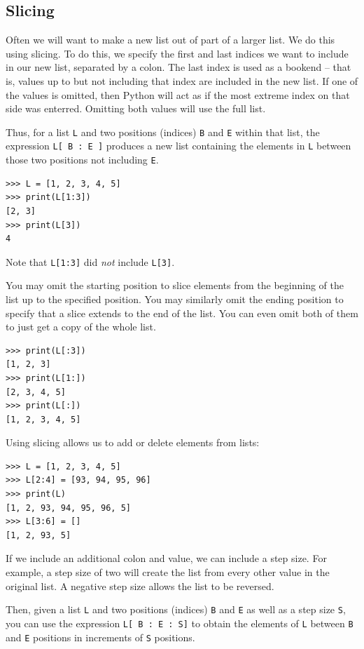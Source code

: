 \documentclass[11pt]{cselabheader}
\begin{document}
\subsection{Slicing}
Often we will want to make a new list out of part of a larger list. We do this
using slicing. To do this, we specify the first and last indices we want to
include in our new list, separated by a colon. The last index is used as a
bookend -- that is, values up to but not including that index are included in
the new list. If one of the values is omitted, then Python will act as if the
most extreme index on that side was enterred. Omitting both values will use the
full list.

Thus, for a list \lstinline!L! and two positions (indices) \lstinline!B! and
\lstinline!E! within that list, the expression \lstinline!L[ B : E ]! produces a
new list containing the elements in \lstinline!L! between those two positions
not including \lstinline!E!.

\begin{lstlisting}[style=ipython]
>>> L = [1, 2, 3, 4, 5]
>>> print(L[1:3])
[2, 3]
>>> print(L[3])
4
\end{lstlisting}

Note that \lstinline!L[1:3]! did \emph{not} include \lstinline!L[3]!. 

You may omit the starting position to slice elements from the beginning of the
list up to the specified position. You may similarly omit the ending position to
specify that a slice extends to the end of the list. You can even omit both of
them to just get a copy of the whole list.

\begin{lstlisting}[style=ipython]
>>> print(L[:3])
[1, 2, 3]
>>> print(L[1:])
[2, 3, 4, 5]
>>> print(L[:])
[1, 2, 3, 4, 5]
\end{lstlisting}

Using slicing allows us to add or delete elements from lists:
\begin{lstlisting}[style=ipython]
>>> L = [1, 2, 3, 4, 5]
>>> L[2:4] = [93, 94, 95, 96]
>>> print(L)
[1, 2, 93, 94, 95, 96, 5]
>>> L[3:6] = []
[1, 2, 93, 5]
\end{lstlisting}

If we include an additional colon and value, we can include a step size. For
example, a step size of two will create the list from every other value in the
original list. A negative step size allows the list to be reversed.

Then, given a list \lstinline!L! and two positions (indices) \lstinline!B! and
\lstinline!E! as well as a step size \lstinline!S!, you can use the expression
\lstinline!L[ B : E : S]! to obtain the elements of \lstinline!L! between
\lstinline!B! and \lstinline!E! positions in increments of \lstinline!S!
positions.
\end{document}
